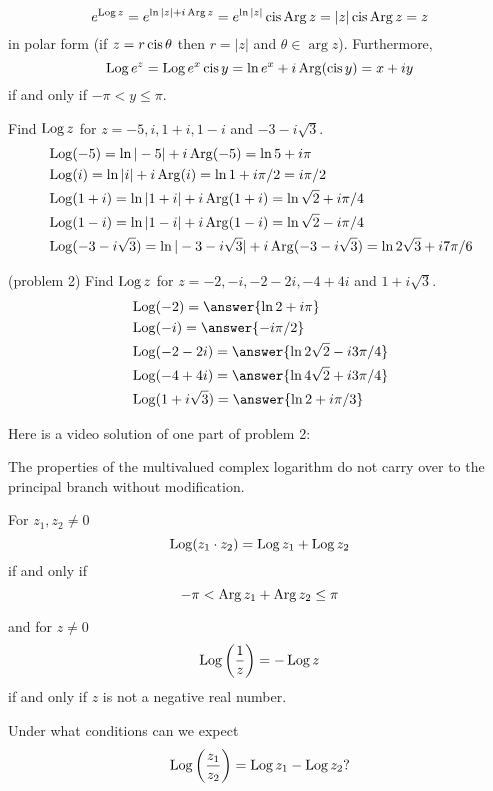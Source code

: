 \documentclass[handout]{ximera}
\begin{document}
\[
e^{\operatorname{Log} z} = e^{\ln |z| + i\operatorname{Arg} z} = e^{\ln |z|} \operatorname{cis} \operatorname{Arg} z = |z| \operatorname{cis} \operatorname{Arg} z =z
\]
in polar form (if $z=r\operatorname{cis} \theta$ then $r = |z|$ and $\theta \in \arg z$).
Furthermore,
\[
\operatorname{Log} e^z = \operatorname{Log} e^x\operatorname{cis} y = \ln e^x + i\operatorname{Arg}(\operatorname{cis} y) = x+iy
\]
if and only if $-\pi < y \leq \pi$.




\begin{example}[Example 2] 
Find $\operatorname{Log} z$ for $z = -5, i, 1+i, 1-i$ and $-3-i\sqrt 3$.\\
\begin{align*}
& \operatorname{Log}(-5) = \ln|-5|+ i \operatorname{Arg}(-5) = \ln 5 + i\pi\\
& \operatorname{Log}(i) = \ln|i|+ i \operatorname{Arg}(i) = \ln 1 + i\pi/2 = i\pi/2\\
& \operatorname{Log}(1+i) = \ln|1+i|+ i \operatorname{Arg}(1+i) = \ln \sqrt 2 + i\pi/4\\
& \operatorname{Log}(1-i) = \ln|1-i|+ i \operatorname{Arg}(1-i) = \ln \sqrt 2 - i\pi/4\\
& \operatorname{Log}(-3-i\sqrt 3) = \ln|-3-i\sqrt 3|+ i \operatorname{Arg}(-3-i\sqrt 3) = \ln 2\sqrt 3 + i7\pi/6
\end{align*}
\end{example}


\begin{problem}(problem 2) 
Find $\operatorname{Log} z$ for $z = -2, -i, -2-2i, -4+4i$ and $1+i\sqrt 3$.\\
\begin{align*}
& \Log(-2) = \answer{\ln 2 + i\pi }\\
& \Log(-i) = \answer{-i\pi/2}\\
& \Log(-2-2i) = \answer{\ln 2\sqrt 2 - i3\pi/4}\\
& \Log(-4+4i) = \answer{\ln 4\sqrt 2 +i3\pi/4}\\
& \Log(1+i\sqrt 3) = \answer{\ln 2+ i\pi/3}
\end{align*}
\end{problem}

Here is a video solution of one part of problem 2:\\
\begin{foldable}
\end{foldable}

The properties of the multivalued complex logarithm do not carry over to the principal branch without modification.
\begin{proposition}
For $z_1, z_2 \neq 0$
\[\operatorname{Log}(z_1\cdot z_2) = \operatorname{Log} z_1 + \operatorname{Log} z_2
\]
if and only if 
\[
-\pi < \operatorname{Arg} z_1 + \operatorname{Arg} z_2 \leq \pi\]

and for $z \neq 0$
\[
\operatorname{Log}\left(\frac{1}{z}\right) = - \operatorname{Log} z
\]
if and only if $z$ is not a negative real number.
\end{proposition}
\begin{question}Under what conditions can we expect
\[
\operatorname{Log}\left(\frac{z_1}{z_2}\right) = \operatorname{Log} z_1 - \operatorname{Log} z_2?
\]
\end{question}
\end{document}
